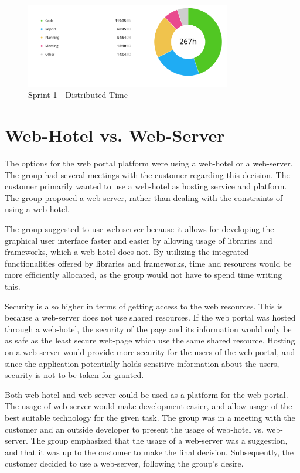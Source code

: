 \begin{figure}[ht]
\centering
    \includegraphics[width=0.8\textwidth]{fig/sprint1-diagram}
\caption{Sprint 1 - Distributed Time}
\label{sprint1_diagram}
\end{figure}

\section{Web-Hotel vs. Web-Server}
\label{webhotel_vs_webserver}
The options for the web portal platform were using a web-hotel or a web-server. The group had several meetings with the customer regarding this decision. The customer primarily wanted to use a web-hotel as hosting service and platform. The group proposed a web-server, rather than dealing with the constraints of using a web-hotel. 

The group suggested to use web-server because it allows for developing the graphical user interface faster and easier by allowing usage of libraries and frameworks, which a web-hotel does not. By utilizing the integrated functionalities offered by libraries and frameworks, time and resources would be more efficiently allocated, as the group would not have to spend time writing this. 

Security is also higher in terms of getting access to the web resources. 
This is because a web-server does not use shared resources. If the web portal was hosted through a web-hotel, the security of the page and its information would only be as safe as the least secure web-page which use the same shared resource. Hosting on a web-server would provide more security for the users of the web portal, and since the application potentially holds sensitive information about the users, security is not to be taken for granted. 

Both web-hotel and web-server could be used as a platform for the web portal. The usage of web-server would make development easier, and allow usage of the best suitable technology for the given task. The group was in a meeting with the customer and an outside developer to present the usage of web-hotel vs. web-server. The group emphasized that the usage of a web-server was a suggestion, and that it was up to the customer to make the final decision. Subsequently, the customer decided to use a web-server, following the group's desire.

